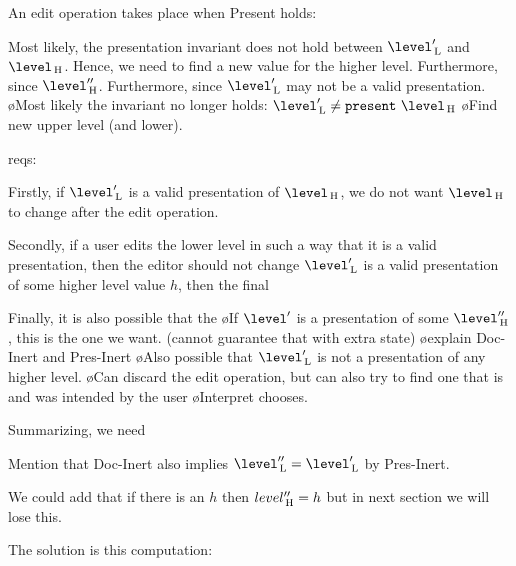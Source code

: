 An edit operation takes place when {\sc Present} holds:


Most likely, the presentation invariant does not hold between $\level'\L$ and $\level\H$. Hence, we need to find a new value for the higher level. Furthermore, since  $\level''\H$. Furthermore, since $\level'\L$ may not be a valid presentation.
\bl
\o Most likely the invariant no longer holds: $\level'\L \neq \present~\level\H$
\o Find new upper level (and lower).
\el

reqs:

Firstly, if $\level'\L$ is a valid presentation of $\level\H$, we do not want $\level\H$ to change after the edit operation. 

Secondly, if a user edits the lower level in such a way that it is a valid presentation, then the editor should not change 
$\level'\L$ is a valid presentation of some higher level value $h$, then the final 


Finally, it is also possible that the 
\bl 
\o If  $\level'$ is a presentation of some $\level''\H$, this is the one we want. (cannot guarantee that with extra state)  
\o explain  {\sc Doc-Inert} and {\sc Pres-Inert}
\o Also possible that $\level'\L$ is not a presentation of any higher level. 
\o Can discard the edit operation, but can also try to find one that is and was intended by the user
\o Interpret chooses.
\el

Summarizing, we need



Mention that {\sc Doc-Inert} also implies $\level''\L = \level'\L$ by {\sc Pres-Inert}.

We could add that if there is an $h$ then $level''_{\, \mathrm H} = h$ but in next section we will lose this.

The solution is this computation:


